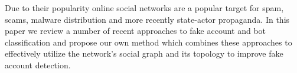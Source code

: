 \noindent Due to their popularity online social networks are a popular target for spam, scams, malware distribution and more recently state-actor propaganda. In this paper we review a number of recent approaches to fake account and bot classification and propose our own method which combines these approaches to effectively utilize the network's social graph and its topology to improve fake account detection.